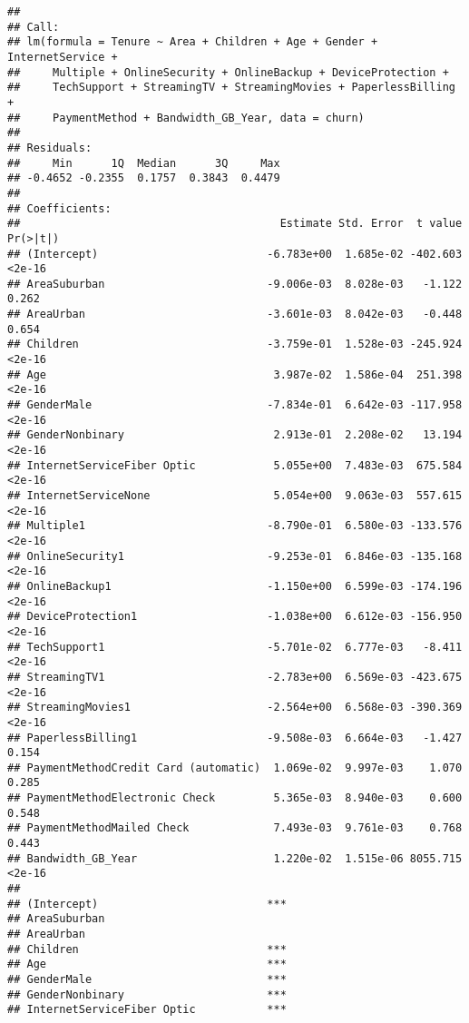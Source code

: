 \documentclass[
]{article}
\begin{document}
\begin{verbatim}
## 
## Call:
## lm(formula = Tenure ~ Area + Children + Age + Gender + InternetService + 
##     Multiple + OnlineSecurity + OnlineBackup + DeviceProtection + 
##     TechSupport + StreamingTV + StreamingMovies + PaperlessBilling + 
##     PaymentMethod + Bandwidth_GB_Year, data = churn)
## 
## Residuals:
##     Min      1Q  Median      3Q     Max 
## -0.4652 -0.2355  0.1757  0.3843  0.4479 
## 
## Coefficients:
##                                        Estimate Std. Error  t value Pr(>|t|)
## (Intercept)                          -6.783e+00  1.685e-02 -402.603   <2e-16
## AreaSuburban                         -9.006e-03  8.028e-03   -1.122    0.262
## AreaUrban                            -3.601e-03  8.042e-03   -0.448    0.654
## Children                             -3.759e-01  1.528e-03 -245.924   <2e-16
## Age                                   3.987e-02  1.586e-04  251.398   <2e-16
## GenderMale                           -7.834e-01  6.642e-03 -117.958   <2e-16
## GenderNonbinary                       2.913e-01  2.208e-02   13.194   <2e-16
## InternetServiceFiber Optic            5.055e+00  7.483e-03  675.584   <2e-16
## InternetServiceNone                   5.054e+00  9.063e-03  557.615   <2e-16
## Multiple1                            -8.790e-01  6.580e-03 -133.576   <2e-16
## OnlineSecurity1                      -9.253e-01  6.846e-03 -135.168   <2e-16
## OnlineBackup1                        -1.150e+00  6.599e-03 -174.196   <2e-16
## DeviceProtection1                    -1.038e+00  6.612e-03 -156.950   <2e-16
## TechSupport1                         -5.701e-02  6.777e-03   -8.411   <2e-16
## StreamingTV1                         -2.783e+00  6.569e-03 -423.675   <2e-16
## StreamingMovies1                     -2.564e+00  6.568e-03 -390.369   <2e-16
## PaperlessBilling1                    -9.508e-03  6.664e-03   -1.427    0.154
## PaymentMethodCredit Card (automatic)  1.069e-02  9.997e-03    1.070    0.285
## PaymentMethodElectronic Check         5.365e-03  8.940e-03    0.600    0.548
## PaymentMethodMailed Check             7.493e-03  9.761e-03    0.768    0.443
## Bandwidth_GB_Year                     1.220e-02  1.515e-06 8055.715   <2e-16
##                                         
## (Intercept)                          ***
## AreaSuburban                            
## AreaUrban                               
## Children                             ***
## Age                                  ***
## GenderMale                           ***
## GenderNonbinary                      ***
## InternetServiceFiber Optic           ***

\end{verbatim}
\end{document}
